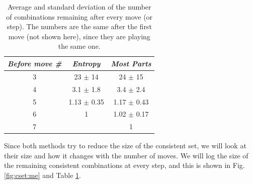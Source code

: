 \documentclass[preprint,12pt]{elsarticle}
\begin{document}
\begin{table}[h!tb]
\centering
\caption{Average and standard deviation of the number of combinations
  remaining after every move (or step). The numbers are the same after
  the  first move (not shown here), since they are playing the same one.\label{tab:cset:me}}
\smallskip
\begin{tabular}{|c|c|c|}
\hline
\emph{Before move \#} & \emph{Entropy} & \emph{Most Parts} \\
\hline
3 & 23 $\pm$ 14& 24 $\pm$  15\\
4 & 3.1 $\pm$ 1.8 & 3.4 $\pm$ 2.4 \\
5 & 1.13 $\pm$ 0.35 & 1.17 $\pm$ 0.43 \\ 
6 & 1 & 1.02 $\pm$ 0.17 \\
7 & & 1 \\
\hline
\end{tabular}
\end{table}
%
Since both methods try to reduce the size of the consistent set, we
will look at their size and how it changes with the number of
moves. We will log the size of the remaining consistent combinations
at every step, and this is shown in Fig. \ref{fig:cset:me} and Table
\ref{tab:cset:me}. 
\end{document}
